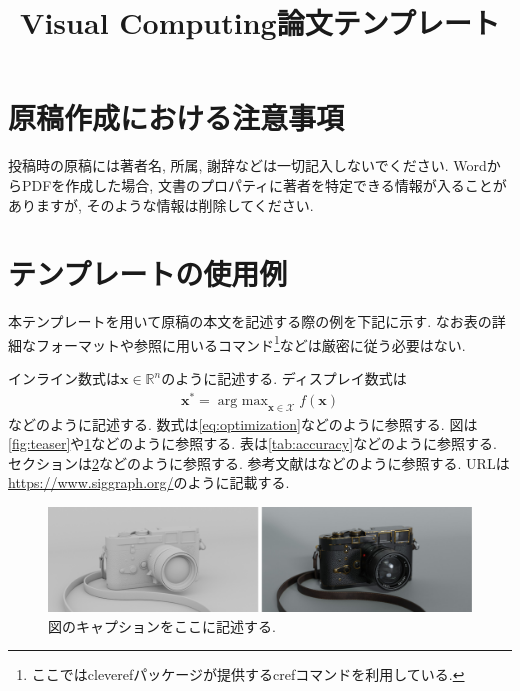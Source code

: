 \documentclass{vc}
\title{Visual Computing論文テンプレート}
\begin{document}
\maketitle


\section{原稿作成における注意事項}

投稿時の原稿には著者名, 所属, 謝辞などは一切記入しないでください.
WordからPDFを作成した場合, 文書のプロパティに著者を特定できる情報が入ることがありますが, そのような情報は削除してください.

\section{テンプレートの使用例}
\label{sec:template}

本テンプレートを用いて原稿の本文を記述する際の例を下記に示す.
なお表の詳細なフォーマットや参照に用いるコマンド\footnote{ここでは\textsf{cleveref}パッケージが提供する\textsf{cref}コマンド\cite{Wikibooks:LaTeX:Ref}を利用している.}などは厳密に従う必要はない.

インライン数式は$\mathbf{x} \in \mathbb{R}^{n}$のように記述する.
ディスプレイ数式は
\begin{align}
  \mathbf{x}^{*} = \mathop{\text{arg max}}_{\mathbf{x} \in \mathcal{X}} f(\mathbf{x})
  \label{eq:optimization}
\end{align}
などのように記述する.
数式は\cref{eq:optimization}などのように参照する.
図は\cref{fig:teaser}や\cref{fig:leica}などのように参照する.
表は\cref{tab:accuracy}などのように参照する.
セクションは\cref{sec:template}などのように参照する.
参考文献は\cite{GSC12,WL00}などのように参照する.
URLは\url{https://www.siggraph.org/}のように記載する.

\begin{figure}
  \centering
  \includegraphics[width=\columnwidth]{./figures/leica.pdf}
  \caption{図のキャプションをここに記述する.}
  \label{fig:leica}
\end{figure}
\end{document}

